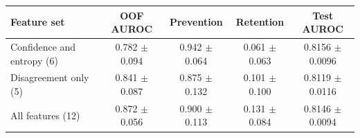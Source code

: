 \begin{tabular}{lcccc}
\toprule
Feature set & OOF AUROC & Prevention & Retention & Test AUROC \\
\midrule
Confidence and entropy (6) & 0.782 $\pm$ 0.094 & 0.942 $\pm$ 0.064 & 0.061 $\pm$ 0.063 & 0.8156 $\pm$ 0.0096 \\
Disagreement only (5) & 0.841 $\pm$ 0.087 & 0.875 $\pm$ 0.132 & 0.101 $\pm$ 0.100 & 0.8119 $\pm$ 0.0116 \\
All features (12) & 0.872 $\pm$ 0.056 & 0.900 $\pm$ 0.113 & 0.131 $\pm$ 0.084 & 0.8146 $\pm$ 0.0094 \\
\bottomrule
\end{tabular}
